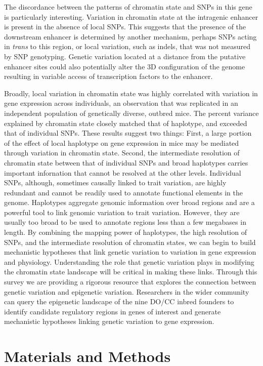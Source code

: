 \documentclass[
  11pt,
]{article}
\begin{document}
The discordance between the patterns of chromatin state and SNPs in this
gene is particularly interesting. Variation in chromatin state at the
intragenic enhancer is present in the absence of local SNPs. This
suggests that the presence of the downstream enhancer is determined by
another mechanism, perhaps SNPs acting in \emph{trans} to this region,
or local variation, such as indels, that was not measured by SNP
genotyping. Genetic variation located at a distance from the putative
enhancer sites could also potentially alter the 3D configuration of the
genome resulting in variable access of transcription factors to the
enhancer.

Broadly, local variation in chromatin state was highly correlated with
variation in gene expression across individuals, an observation that was
replicated in an independent population of genetically diverse, outbred
mice. The percent variance explained by chromatin state closely matched
that of haplotype, and exceeded that of individual SNPs. These results
suggest two things: First, a large portion of the effect of local
haplotype on gene expression in mice may be mediated through variation
in chromatin state. Second, the intermediate resolution of chromatin
state between that of individual SNPs and broad haplotypes carries
important infornation that cannot be resolved at the other levels.
Individual SNPs, although, sometimes causally linked to trait variation,
are highly redundant and cannot be readily used to annotate functional
elements in the genome. Haplotypes aggregate genomic information over
broad regions and are a powerful tool to link genomic variation to trait
variation. However, they are usually too broad to be used to annotate
regions less than a few megabases in length. By combining the mapping
power of haplotypes, the high resolution of SNPs, and the intermediate
resolution of chromatin states, we can begin to build mechanistic
hypotheses that link genetic variation to variation in gene expression
and physiology. Understanding the role that genetic variation plays in
modifying the chromatin state landscape will be critical in making these
links. Through this survey we are providing a rigorous resource that
explores the connection between genetic variation and epigenetic
variation. Researchers in the wider community can query the epigenetic
landscape of the nine DO/CC inbred founders to identify candidate
regulatory regions in genes of interest and generate mechanistic
hypotheses linking genetic variation to gene expression.

\hypertarget{materials-and-methods}{%
\section{Materials and Methods}\label{materials-and-methods}}
\end{document}
